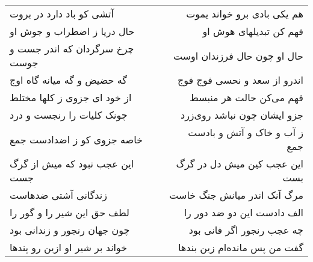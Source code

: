 \begin{center}
\begin{longtable}{l p{0.5cm} r}
آتشی کو باد دارد در بروت
&&
هم یکی بادی برو خواند یموت
\\
حال دریا ز اضطراب و جوش او
&&
فهم کن تبدیلهای هوش او
\\
چرخ سرگردان که اندر جست و جوست
&&
حال او چون حال فرزندان اوست
\\
گه حضیض و گه میانه گاه اوج
&&
اندرو از سعد و نحسی فوج فوج
\\
از خود ای جزوی ز کلها مختلط
&&
فهم می‌کن حالت هر منبسط
\\
چونک کلیات را رنجست و درد
&&
جزو ایشان چون نباشد روی‌زرد
\\
خاصه جزوی کو ز اضدادست جمع
&&
ز آب و خاک و آتش و بادست جمع
\\
این عجب نبود که میش از گرگ جست
&&
این عجب کین میش دل در گرگ بست
\\
زندگانی آشتی ضدهاست
&&
مرگ آنک اندر میانش جنگ خاست
\\
لطف حق این شیر را و گور را
&&
الف دادست این دو ضد دور را
\\
چون جهان رنجور و زندانی بود
&&
چه عجب رنجور اگر فانی بود
\\
خواند بر شیر او ازین رو پندها
&&
گفت من پس مانده‌ام زین بندها
\\
\end{longtable}
\end{center}
